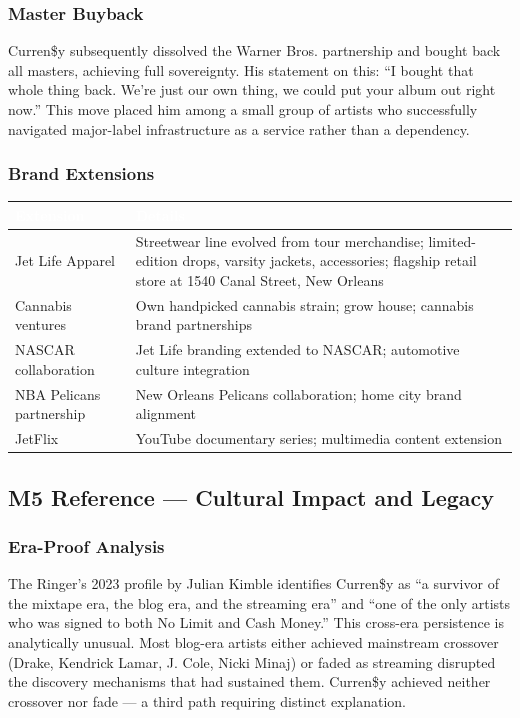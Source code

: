 \documentclass[11pt,letterpaper]{article}
\newcommand{\tableheader}[1]{\textbf{\sffamily\textcolor{white}{#1}}}
\begin{document}
\subsubsection{Master Buyback}

Curren\$y subsequently dissolved the Warner Bros. partnership and bought back all masters, achieving full sovereignty. His statement on this: ``I bought that whole thing back. We're just our own thing, we could put your album out right now.'' This move placed him among a small group of artists who successfully navigated major-label infrastructure as a service rather than a dependency.

\subsubsection{Brand Extensions}

\begin{center}
\begin{tabularx}{\textwidth}{L{3.5cm}X}
\toprule
{}
\tableheader{Extension} & \tableheader{Details} \\
\midrule
Jet Life Apparel & Streetwear line evolved from tour merchandise; limited-edition drops, varsity jackets, accessories; flagship retail store at 1540 Canal Street, New Orleans \\
Cannabis ventures & Own handpicked cannabis strain; grow house; cannabis brand partnerships \\
NASCAR collaboration & Jet Life branding extended to NASCAR; automotive culture integration \\
NBA Pelicans partnership & New Orleans Pelicans collaboration; home city brand alignment \\
JetFlix & YouTube documentary series; multimedia content extension \\
\bottomrule
\end{tabularx}
\end{center}

\subsection{M5 Reference — Cultural Impact and Legacy}

\subsubsection{Era-Proof Analysis}

The Ringer's 2023 profile by Julian Kimble identifies Curren\$y as ``a survivor of the mixtape era, the blog era, and the streaming era'' and ``one of the only artists who was signed to both No Limit and Cash Money.'' This cross-era persistence is analytically unusual. Most blog-era artists either achieved mainstream crossover (Drake, Kendrick Lamar, J. Cole, Nicki Minaj) or faded as streaming disrupted the discovery mechanisms that had sustained them. Curren\$y achieved neither crossover nor fade — a third path requiring distinct explanation.
\end{document}
